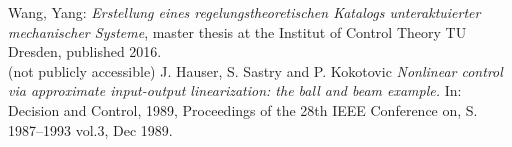 \documentclass[10pt,a4paper]{article}
\begin{document}
	
	\begin{thebibliography}{10}		
		Wang, Yang: 
		\textit{Erstellung eines regelungstheoretischen Katalogs unteraktuierter mechanischer Systeme}, master thesis at the Institut of Control Theory TU Dresden, published 2016. \\
		(not publicly accessible)
		J. Hauser, S. Sastry and P. Kokotovic 
		\textit{Nonlinear control via approximate input-output linearization: the ball and beam example.} In: Decision and Control, 1989, Proceedings of the 28th IEEE Conference on, S. 1987–1993 vol.3, Dec 1989.
	\end{thebibliography}
\end{document}
